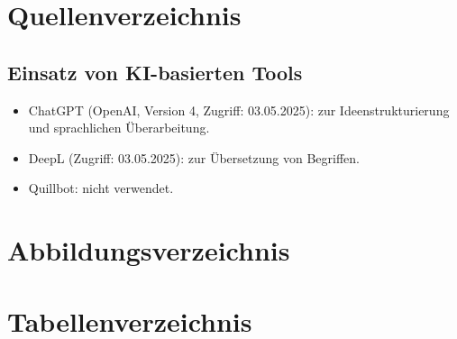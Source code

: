 \documentclass[11pt,a4paper]{article}
\makeatletter
\renewcommand{\listoffigures}{%
  \vspace{-0.5\baselineskip} %
  \@starttoc{lof}%
}
\renewcommand{\listoftables}{%
  \vspace{-0.5\baselineskip}
  \@starttoc{lot}%
}
\makeatother
\begin{document}
\cleardoublepage
\section{Quellenverzeichnis}

\printbibliography[heading=none]

\vspace{2cm}

\subsection*{Einsatz von KI-basierten Tools}
\begin{itemize}
  \item ChatGPT (OpenAI, Version 4, Zugriff: 03.05.2025): zur Ideenstrukturierung und sprachlichen Überarbeitung.
  \item DeepL (Zugriff: 03.05.2025): zur Übersetzung von Begriffen.
  \item Quillbot: nicht verwendet.
\end{itemize}

\cleardoublepage
\section{Abbildungsverzeichnis}
\listoffigures

\cleardoublepage
\section{Tabellenverzeichnis}
\listoftables
\end{document}

